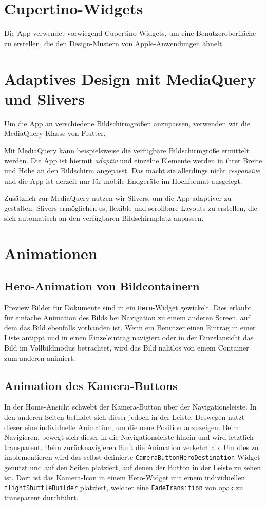 \section{Cupertino-Widgets}
Die App verwendet vorwiegend Cupertino-Widgets, um eine Benutzeroberfläche zu erstellen, 
die den Design-Mustern von Apple-Anwendungen ähnelt.

\section{Adaptives Design mit MediaQuery und Slivers}
Um die App an verschiedene Bildschirmgrößen anzupassen, verwenden wir die MediaQuery-Klasse von Flutter.

Mit MediaQuery kann beispielsweise die verfügbare Bildschirmgröße ermittelt werden. 
Die App ist hiermit \textit{adaptiv} und einzelne Elemente werden in ihrer Breite und Höhe an den Bildschirm angepasst.
Das macht sie allerdings nicht \textit{responsive} und die App ist derzeit nur für mobile Endgeräte im Hochformat ausgelegt.

Zusätzlich zur MediaQuery nutzen wir Slivers, um die App adaptiver zu gestalten. 
Slivers ermöglichen es, flexible und scrollbare Layouts zu erstellen, die sich automatisch an den verfügbaren Bildschirmplatz anpassen.

\section{Animationen}

\subsection{Hero-Animation von Bildcontainern}
Preview Bilder für Dokumente sind in ein \verb|Hero|-Widget gewickelt. Dies erlaubt für einfache Animation des Bilds bei Navigation zu einem anderen Screen, auf dem das Bild ebenfalls vorhanden ist. 
Wenn ein Benutzer einen Eintrag in einer Liste antippt und in einen Einzeleintrag navigiert oder in der Einzelansicht das Bild im Vollbildmodus betrachtet, 
wird das Bild nahtlos von einem Container zum anderen animiert.

\subsection{Animation des Kamera-Buttons}
In der Home-Ansicht schwebt der Kamera-Button über der Navigationsleiste. In den anderen Seiten befindet sich dieser jedoch in der Leiste.
Deswegen nutzt dieser eine individuelle Animation, um die neue Position anzuzeigen.
Beim Navigieren, bewegt sich dieser in die Navigationsleiste hinein und wird letztlich transparent. Beim zurücknavigieren läuft die Animation verkehrt ab.
Um dies zu implementieren wird das selbst definierte \verb|CameraButtonHeroDestination|-Widget genutzt und auf den Seiten platziert, auf denen der Button in der Leiste zu sehen ist. Dort ist das Kamera-Icon in einem Hero-Widget mit einem individuellen \verb|flightShuttleBuilder| platziert, welcher eine \verb|FadeTransition| von opak zu transparent durchführt.

